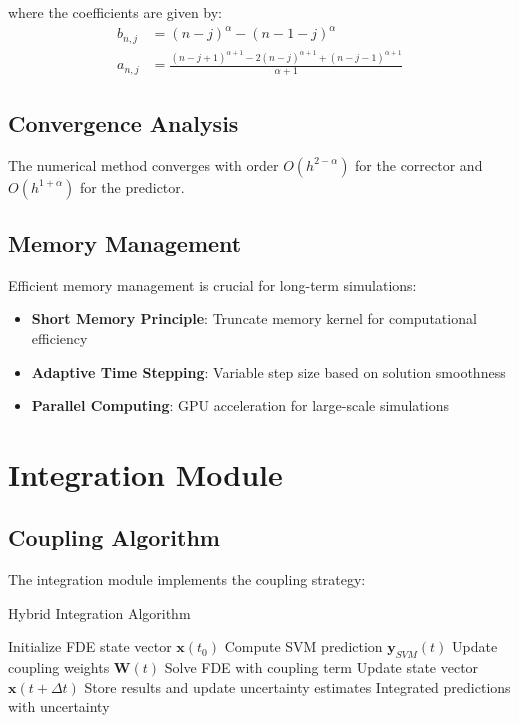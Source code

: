 \documentclass[12pt,a4paper]{report}
\begin{document}
where the coefficients are given by:
\begin{align}
b_{n,j} &= (n-j)^\alpha - (n-1-j)^\alpha \\
a_{n,j} &= \frac{(n-j+1)^{\alpha+1} - 2(n-j)^{\alpha+1} + (n-j-1)^{\alpha+1}}{\alpha+1}
\end{align}

\subsection{Convergence Analysis}

The numerical method converges with order $O(h^{2-\alpha})$ for the corrector and $O(h^{1+\alpha})$ for the predictor.

\subsection{Memory Management}

Efficient memory management is crucial for long-term simulations:

\begin{itemize}
    \item \textbf{Short Memory Principle}: Truncate memory kernel for computational efficiency
    \item \textbf{Adaptive Time Stepping}: Variable step size based on solution smoothness
    \item \textbf{Parallel Computing}: GPU acceleration for large-scale simulations
\end{itemize}

\section{Integration Module}

\subsection{Coupling Algorithm}

The integration module implements the coupling strategy:

\begin{algorithm}[H]
\caption{Hybrid Integration Algorithm}
\begin{algorithmic}[1]
\STATE Initialize FDE state vector $\mathbf{x}(t_0)$
    \STATE Compute SVM prediction $\mathbf{y}_{SVM}(t)$
    \STATE Update coupling weights $\mathbf{W}(t)$
    \STATE Solve FDE with coupling term
    \STATE Update state vector $\mathbf{x}(t + \Delta t)$
    \STATE Store results and update uncertainty estimates
\ENDFOR
\RETURN Integrated predictions with uncertainty
\end{algorithmic}
\end{algorithm}
\end{document}

